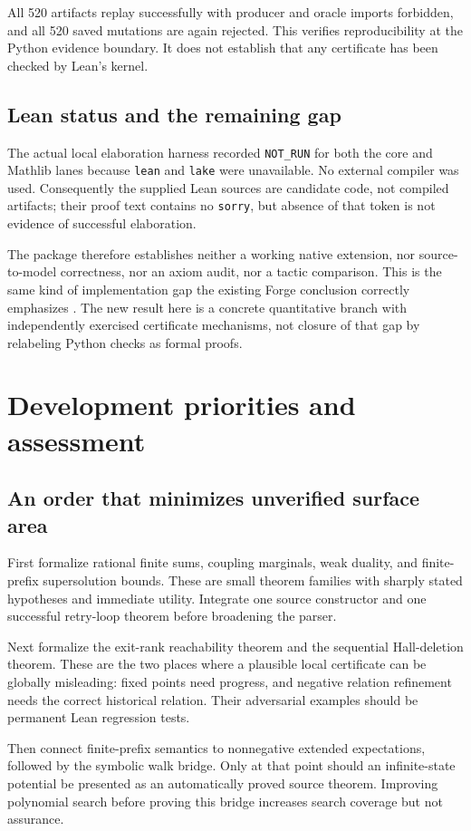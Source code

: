 \documentclass[11pt,letterpaper]{article}
\theoremstyle{definition}\newtheorem{definition}[theorem]{Definition}
\theoremstyle{remark}\newtheorem{remark}[theorem]{Remark}
\newcommand{\code}[1]{\texttt{#1}}
\begin{document}
All 520 artifacts replay successfully with producer and oracle imports forbidden, and all 520 saved mutations are again rejected. This verifies reproducibility at the Python evidence boundary. It does not establish that any certificate has been checked by Lean's kernel.

\subsection{Lean status and the remaining gap}
The actual local elaboration harness recorded \code{NOT\_RUN} for both the core and Mathlib lanes because \code{lean} and \code{lake} were unavailable. No external compiler was used. Consequently the supplied Lean sources are candidate code, not compiled artifacts; their proof text contains no \code{sorry}, but absence of that token is not evidence of successful elaboration.

The package therefore establishes neither a working native \forge{} extension, nor source-to-model correctness, nor an axiom audit, nor a tactic comparison. This is the same kind of implementation gap the existing Forge conclusion correctly emphasizes \cite{forge-conclusion}. The new result here is a concrete quantitative branch with independently exercised certificate mechanisms, not closure of that gap by relabeling Python checks as formal proofs.

\section{Development priorities and assessment}
\subsection{An order that minimizes unverified surface area}
First formalize rational finite sums, coupling marginals, weak duality, and finite-prefix supersolution bounds. These are small theorem families with sharply stated hypotheses and immediate utility. Integrate one source constructor and one successful retry-loop theorem before broadening the parser.

Next formalize the exit-rank reachability theorem and the sequential Hall-deletion theorem. These are the two places where a plausible local certificate can be globally misleading: fixed points need progress, and negative relation refinement needs the correct historical relation. Their adversarial examples should be permanent Lean regression tests.

Then connect finite-prefix semantics to nonnegative extended expectations, followed by the symbolic walk bridge. Only at that point should an infinite-state potential be presented as an automatically proved source theorem. Improving polynomial search before proving this bridge increases search coverage but not assurance.
\end{document}
